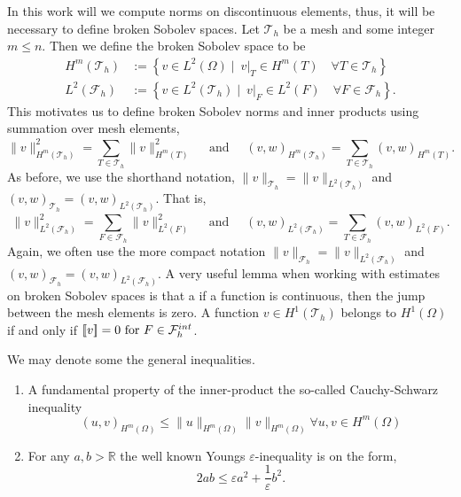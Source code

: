 In this work will we compute norms on discontinuous elements, thus, it will be necessary to define broken Sobolev spaces.
Let $\mathcal{T}_{h} $ be a mesh and some integer $m\le n$. Then we define the broken Sobolev space to be \[
    \begin{split}
H^{m}( \mathcal{T}_{h} ) & := \left\{ v \in L^2( \Omega )  \mid \ v|_{T} \in H^{m}( T) \quad     \forall T \in  \mathcal{T}_{h} \right\}\\
        L^{2}( \mathcal{F}_{h} ) &:= \left\{ v \in L^2( \mathcal{T}_{h}  )  \mid   \ v|_{F} \in L^{2}( F)  \quad  \forall F \in  \mathcal{F}_{h}   \right\}.
    \end{split}
\]
This motivates us to define broken Sobolev norms and inner products using summation over mesh elements,
\[
 \| v \|_{H^{m}( \mathcal{T}_{h} ) }^{2} = \sum_{T \in  \mathcal{T}_{h} }^{} \| v  \|_{ H^{m}( T ) }^{2  } \quad \text{ and } \quad
 (v ,w )_{H^{m}( \mathcal{T}_{h} ) }^{} = \sum_{T \in \mathcal{T} _{h}}^{} (v ,w )_{ H^{m}( T ) }^{  } .
\]
As before, we use the shorthand notation,  $\| v \|_{\mathcal{T}_{h}} =  \| v \|_{L^{2}( \mathcal{T}_{h} ) }$ and  $(v ,w )_{ \mathcal{T}_{h} }^{} = (v ,w )_{L^2( \mathcal{T}_{h} ) }^{} $.
That is,
\[
 \| v \|_{L^{2}( \mathcal{F}_{h} ) }^{2} = \sum_{F \in  \mathcal{F}_{h} }^{} \| v  \|_{ L^{2}( F ) }^{2  } \quad \text{ and } \quad
 (v ,w )_{L^{2}( \mathcal{F}_{h} ) }^{} = \sum_{T \in \mathcal{F} _{h}}^{} (v ,w )_{ L^{2}( F ) }^{  } .
\]
Again, we often use the more compact notation $\| v \|_{\mathcal{F}_{h}} =  \| v \|_{L^{2}( \mathcal{F}_{h} ) }$ and  $(v ,w )_{ \mathcal{F}_{h} }^{} = (v ,w )_{L^2( \mathcal{F}_{h} ) }^{} $.
A very useful lemma when working with estimates on broken Sobolev spaces is that a if a function is continuous, then the jump between the mesh elements is zero. A function $ v \in  H^{1}( \mathcal{T}_{h} ) $ belongs to $ H^{1}( \Omega )  $ if and only
if $ \left[\!\left[  v  \right]\!\right]   = 0 \text{ for }  F \in \mathcal{F}^{int}_{h}$.

We may denote some the general inequalities.
\begin{enumerate}[label=(\roman*)]
    \item A fundamental property of the inner-product the so-called Cauchy-Schwarz inequality
        \begin{equation}
            \label{eq:cauchy-schwartz}
     ( u,v)_{H^{m}( \Omega )  }   \le \| u \|_{H^{m}( \Omega )   }^{  } \| v \|_{H^{m}( \Omega )    }^{  } \forall u,v \in H^{m}( \Omega )
        \end{equation}

    \item For any $a,b >\mathbb{R} $ the well known Youngs $\varepsilon $-inequality is on the form,
        \begin{equation}
            \label{eq:young-epsilon}
            2ab \le \varepsilon a^2+ \frac{1}{\varepsilon } b^2.
        \end{equation}
\end{enumerate}



